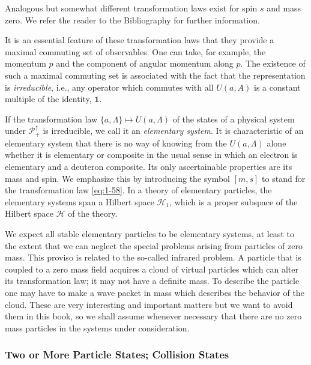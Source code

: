 Analogous but somewhat different transformation laws exist for spin $s$ and
mass zero. We refer the reader to the Bibliography for further information.

It is an essential feature of these transformation laws that they provide a
maximal commuting set of observables. One can take, for example, the momentum
$p$ and the component of angular momentum along $p$. The existence of such a
maximal commuting set is associated with the fact that the representation is
\emph{irreducible}, i.e., any operator which commutes with all $U(a,A)$ is a
constant multiple of the identity, $\mathbf{1}$.

If the transformation law $\{a,\Lambda\}\mapsto U(a,\Lambda)$ of the states of
a physical system under $\mathcal{P}^{\uparrow}_{+}$ is irreducible, we call it
an \emph{elementary system}. It is characteristic of an elementary system that
there is no way of knowing from the $U(a,\Lambda)$ alone whether it is
elementary or composite in the usual sense in which an electron is elementary
and a deuteron composite. Its only ascertainable properties are its mass and
spin. We emphasize this by introducing the symbol $[m,s]$ to stand for the
transformation law \eqref{eq:1-58}. In a theory of elementary particles, the elementary
systems span a Hilbert space $\mathcal{H}_1$, which is a proper subspace of the
Hilbert space $\mathcal{H}$ of the theory.

We expect all stable elementary particles to be elementary systems, at least to
the extent that we can neglect the special problems arising from particles of
zero mass. This proviso is related to the so-called infrared problem. A particle
that is coupled to a zero mass field acquires a cloud of virtual particles which
can alter its transformation law; it may not have a definite mass. To describe
the particle one may have to make a wave packet in mass which describes the
behavior of the cloud. These are very interesting and important matters but we
want to avoid them in this book, so we shall assume whenever necessary that there
are no zero mass particles in the systems under consideration.

\subsubsection{Two or More Particle States; Collision States}

